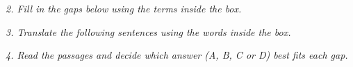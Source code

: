 \documentclass{exam}
\begin{document}
\noindent \textit{2. Fill in the gaps below using the terms inside the box.}

%
%
%
%
%
%
%
%
%
%
%
%
%
%
%
%
%
%
%
%


\noindent \textit{3. Translate the following sentences using the words inside the box.}

\begin{CJK*}{UTF8}{gbsn}
%
%
%
%
%
%
%
%
%
%
%
%
%
%
%
%
%
%
%
%
\end{CJK*}

\noindent \textit{4. Read the passages and decide which answer (A, B, C or D) best fits each gap.}

%
%
%
%
%
%
%
%
%
%
%
%
%
%
%
%
%
%
%
%
\end{document}
